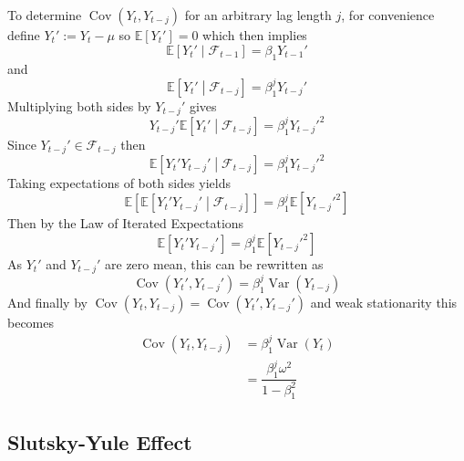 \documentclass[11pt]{report} %
\begin{document}
To determine $\operatorname{Cov}\left(Y_{t}, Y_{t - j}\right)$ for an arbitrary lag length $j$, for convenience define $Y_{t}' := Y_{t} - \mu$ so $\mathbb{E}\left[Y_{t}'\right] = 0$ which then implies
\begin{equation}
\mathbb{E}\left[Y_{t}'\middle|\mathcal{F}_{t-1}\right] = \beta_{1}Y_{t - 1}'
\end{equation}
and
\begin{equation}
\mathbb{E}\left[Y_{t}'\middle|\mathcal{F}_{t-j}\right] = \beta_{1}^{j}Y_{t - j}'
\end{equation}
Multiplying both sides by $Y_{t - j}'$ gives
\begin{equation}
Y_{t - j}'\mathbb{E}\left[Y_{t}'\middle|\mathcal{F}_{t-j}\right] = \beta_{1}^{j}Y_{t - j}'^{2}
\end{equation}
Since $Y_{t - j}' \in \mathcal{F}_{t- j}$ then
\begin{equation}
\mathbb{E}\left[Y_{t}'Y_{t - j}'\middle|\mathcal{F}_{t-j}\right] = \beta_{1}^{j}Y_{t - j}'^{2}
\end{equation}
Taking expectations of both sides yields
\begin{equation}
\mathbb{E}\left[\mathbb{E}\left[Y_{t}'Y_{t - j}'\middle|\mathcal{F}_{t-j}\right]\right] = \beta_{1}^{j}\mathbb{E}\left[Y_{t - j}'^{2}\right]
\end{equation}
Then by the Law of Iterated Expectations
\begin{equation}
\mathbb{E}\left[Y_{t}'Y_{t - j}'\right] = \beta_{1}^{j}\mathbb{E}\left[Y_{t - j}'^{2}\right]
\end{equation}
As $Y_{t}'$ and $Y_{t - j}'$ are zero mean, this can be rewritten as
\begin{equation}
\operatorname{Cov}\left(Y_{t}', Y_{t - j}'\right) = \beta_{1}^{j}\operatorname{Var}\left(Y_{t - j}\right)
\end{equation}
And finally by $\operatorname{Cov}\left(Y_{t}, Y_{t - j}\right) = \operatorname{Cov}\left(Y_{t}', Y_{t - j}'\right)$ and weak stationarity this becomes
\begin{align}
\operatorname{Cov}\left(Y_{t}, Y_{t - j}\right) &= \beta_{1}^{j}\operatorname{Var}\left(Y_{t}\right) \\
&= \dfrac{\beta_{1}^{j}\omega^{2}}{1 - \beta_{1}^{2}}
\end{align}

\subsection{Slutsky-Yule Effect}
\end{document}
